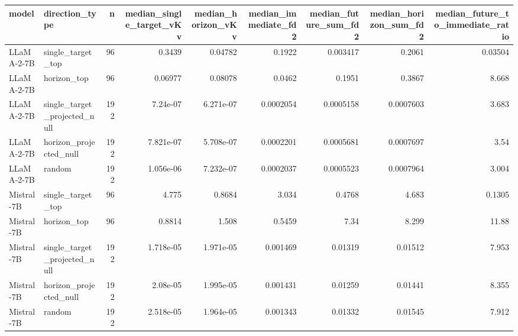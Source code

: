 \begin{tabular}{llrrrrrrr}
\toprule
model & direction_type & n & median_single_target_vKv & median_horizon_vKv & median_immediate_fd2 & median_future_sum_fd2 & median_horizon_sum_fd2 & median_future_to_immediate_ratio \\
\midrule
LLaMA-2-7B & single_target_top & 96 & 0.3439 & 0.04782 & 0.1922 & 0.003417 & 0.2061 & 0.03504 \\
LLaMA-2-7B & horizon_top & 96 & 0.06977 & 0.08078 & 0.0462 & 0.1951 & 0.3867 & 8.668 \\
LLaMA-2-7B & single_target_projected_null & 192 & 7.24e-07 & 6.271e-07 & 0.0002054 & 0.0005158 & 0.0007603 & 3.683 \\
LLaMA-2-7B & horizon_projected_null & 192 & 7.821e-07 & 5.708e-07 & 0.0002201 & 0.0005681 & 0.0007697 & 3.54 \\
LLaMA-2-7B & random & 192 & 1.056e-06 & 7.232e-07 & 0.0002037 & 0.0005523 & 0.0007964 & 3.004 \\
Mistral-7B & single_target_top & 96 & 4.775 & 0.8684 & 3.034 & 0.4768 & 4.683 & 0.1305 \\
Mistral-7B & horizon_top & 96 & 0.8814 & 1.508 & 0.5459 & 7.34 & 8.299 & 11.88 \\
Mistral-7B & single_target_projected_null & 192 & 1.718e-05 & 1.971e-05 & 0.001469 & 0.01319 & 0.01512 & 7.953 \\
Mistral-7B & horizon_projected_null & 192 & 2.08e-05 & 1.995e-05 & 0.001431 & 0.01259 & 0.01441 & 8.355 \\
Mistral-7B & random & 192 & 2.518e-05 & 1.964e-05 & 0.001343 & 0.01332 & 0.01545 & 7.912 \\
\bottomrule
\end{tabular}
